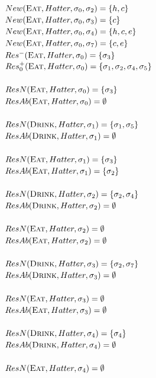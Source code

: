 \documentclass{article}
\begin{document}
$New(\textsc{Eat},Hatter,\sigma_{0},\sigma_{2})=\{h, c\}$\\
$New(\textsc{Eat},Hatter,\sigma_{0},\sigma_{3})=\{c\}$\\
$New(\textsc{Eat},Hatter,\sigma_{0},\sigma_{4})=\{h, c, e\}$\\
$New(\textsc{Eat},Hatter,\sigma_{0},\sigma_{7})=\{c, e\}$\\
$Res^{-}(\textsc{Eat},Hatter,\sigma_{0})=\{\sigma_{3}\}$\\
$Res_{0}^{+}(\textsc{Eat},Hatter,\sigma_{0})=\{\sigma_{1}, \sigma_{2}, \sigma_{4}, \sigma_{5}\}$\\\\
$ResN(\textsc{Eat},Hatter,\sigma_{0})=\{\sigma_{3}\}$\\
$ResAb(\textsc{Eat},Hatter,\sigma_{0})=\emptyset$\\\\
$ResN(\textsc{Drink},Hatter,\sigma_{1})=\{\sigma_{1}, \sigma_{5}\}$\\
$ResAb(\textsc{Drink},Hatter,\sigma_{1})=\emptyset$\\\\
$ResN(\textsc{Eat},Hatter,\sigma_{1})=\{\sigma_{3}\}$\\
$ResAb(\textsc{Eat},Hatter,\sigma_{1})=\{\sigma_{2}\}$\\\\
$ResN(\textsc{Drink},Hatter,\sigma_{2})=\{\sigma_{2}, \sigma_{4}\}$\\
$ResAb(\textsc{Drink},Hatter,\sigma_{2})=\emptyset$\\\\
$ResN(\textsc{Eat},Hatter,\sigma_{2})=\emptyset$\\
$ResAb(\textsc{Eat},Hatter,\sigma_{2})=\emptyset$\\\\
$ResN(\textsc{Drink},Hatter,\sigma_{3})=\{\sigma_{2}, \sigma_{7}\}$\\
$ResAb(\textsc{Drink},Hatter,\sigma_{3})=\emptyset$\\\\
$ResN(\textsc{Eat},Hatter,\sigma_{3})=\emptyset$\\
$ResAb(\textsc{Eat},Hatter,\sigma_{3})=\emptyset$\\\\
$ResN(\textsc{Drink},Hatter,\sigma_{4})=\{\sigma_{4}\}$\\
$ResAb(\textsc{Drink},Hatter,\sigma_{4})=\emptyset$\\\\
$ResN(\textsc{Eat},Hatter,\sigma_{4})=\emptyset$\\
\end{document}
